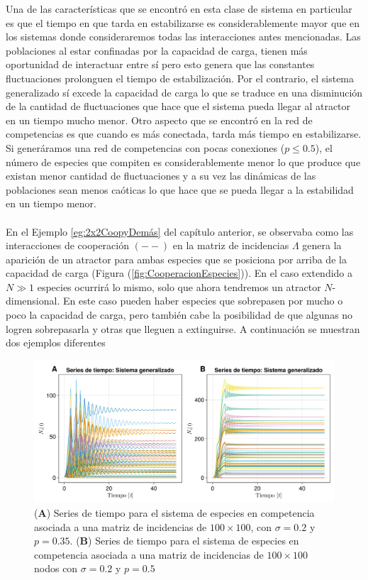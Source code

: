 Una de las características que se encontró en esta clase de sistema en particular es que el tiempo en que tarda en estabilizarse es considerablemente mayor que en los sistemas donde consideraremos todas las interacciones antes mencionadas. Las poblaciones al estar confinadas por la capacidad de carga, tienen más oportunidad de interactuar entre sí pero esto genera que las constantes fluctuaciones prolonguen el tiempo de estabilización.
Por el contrario, el sistema generalizado sí excede la capacidad de carga lo que se traduce en una disminución de la cantidad de fluctuaciones que hace que el sistema pueda llegar al atractor en un tiempo mucho menor. Otro aspecto que se encontró en la red de competencias es que cuando es más conectada, tarda más tiempo en estabilizarse. Si generáramos una red de competencias con pocas conexiones ($p\leq 0.5$), el número de especies que compiten es considerablemente menor lo que produce que existan menor cantidad de fluctuaciones y a su vez las dinámicas de las poblaciones sean menos caóticas lo que hace que se pueda llegar a la estabilidad en un tiempo menor.\\
\\
En el Ejemplo \ref{eg:2x2CoopyDemás} del capítulo anterior, se observaba como las interacciones de cooperación $(--)$ en la matriz de incidencias $\Lambda$ genera la aparición de un atractor para ambas especies que se posiciona por arriba de la capacidad de carga (Figura (\ref{fig:CooperacionEspecies})). En el caso extendido a $N\gg 1$ especies ocurrirá lo mismo, solo que ahora tendremos un atractor $N$-dimensional. En este caso pueden haber especies que sobrepasen por mucho o poco la capacidad de carga, pero también cabe la posibilidad de que algunas no logren sobrepasarla y otras que lleguen a extinguirse. A continuación se muestran dos ejemplos diferentes
\begin{figure}[h!]
	\centering
	\includegraphics[scale=0.23]{../Imagenes/Series de Tiempo LK100}
	\caption{(\textbf{A}) Series de tiempo para el sistema de especies en competencia asociada a una matriz de incidencias de $100\times100$, con $\sigma=0.2$ y $p=0.35$. (\textbf{B}) Series de tiempo para el sistema de especies en competencia asociada a una matriz de incidencias de $100\times 100$ nodos con $\sigma=0.2$ y $p=0.5$}
	\label{fig:SeriesdeTiempoLK100}
\end{figure}

